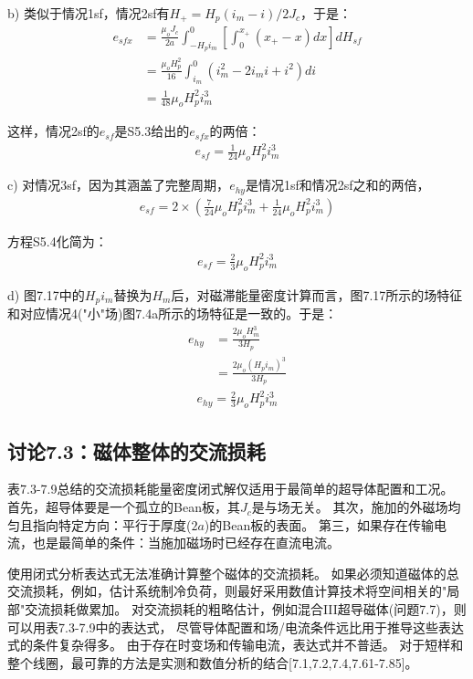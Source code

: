 b) 类似于情况1sf，情况2sf有$H_+=H_p(i_m-i)/2J_c$，于是：
\begin{align*}%
e_{sfx}&=\frac{\mu_oJ_c}{2a}\int_{-H_pi_m}^{0}\left[\int_{0}^{x_+}(x_+-x)dx\right]dH_{sf} \\
&=\frac{\mu_oH_{p}^{2}}{16}\int_{i_m}^{0}(i_{m}^{2}-2i_mi+i^2)di \\
&=\frac{1}{48}\mu_oH_{p}^{2}i_{m}^{3} \tag{S5.3c}
\end{align*}

这样，情况2sf的$e_{sf}$是S5.3给出的$e_{sfx}$的两倍：
\begin{align*}%
e_{sf}=\frac{1}{24}\mu_oH_{p}^{2}i_{m}^{3} \tag{7.26b}
\end{align*}

c) 对情况3sf，因为其涵盖了完整周期，$e_{hy}$是情况1sf和情况2sf之和的两倍，
\begin{align*}%
e_{sf}=2\times\left(\frac{7}{24}\mu_oH_{p}^{2}i_{m}^{3}+\frac{1}{24}\mu_oH_{p}^{2}i_{m}^{3}\right) \tag{S5.4}
\end{align*}

方程S5.4化简为：
\begin{align*}%
e_{sf}=\frac{2}{3}\mu_oH_{p}^{2}i_{m}^{3} \tag{7.26c}
\end{align*}

d) 图7.17中的$H_p i_m$替换为$H_m$后，对磁滞能量密度计算而言，图7.17所示的场特征和对应情况4("小"场)图7.4a所示的场特征是一致的。于是：
\begin{align*}%
e_{hy}&=\frac{2\mu_oH_{m}^{3}}{3H_p} \\ \tag{7.20a}
&=\frac{2\mu_o(H_pi_m)^3}{3H_p} 
\end{align*}
\begin{align*}
e_{hy}=\frac{2}{3}\mu_oH_{p}^{2}i_{m}^{3} \tag{7.26c}
\end{align*}


\subsection{讨论7.3：磁体整体的交流损耗}
表7.3-7.9总结的交流损耗能量密度闭式解仅适用于最简单的超导体配置和工况。
首先，超导体要是一个孤立的Bean板，其$J_c$是与场无关。
其次，施加的外磁场均匀且指向特定方向：平行于厚度($2a$)的Bean板的表面。
第三，如果存在传输电流，也是最简单的条件：当施加磁场时已经存在直流电流。

使用闭式分析表达式无法准确计算整个磁体的交流损耗。
如果必须知道磁体的总交流损耗，例如，估计系统制冷负荷，则最好采用数值计算技术将空间相关的"局部"交流损耗做累加。
对交流损耗的粗略估计，例如混合III超导磁体(问题7.7)，则可以用表7.3-7.9中的表达式，
尽管导体配置和场/电流条件远比用于推导这些表达式的条件复杂得多。
由于存在时变场和传输电流，表达式并不普适。
对于短样和整个线圈，最可靠的方法是实测和数值分析的结合[7.1,7.2,7.4,7.61-7.85]。

